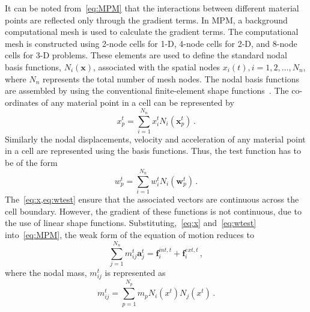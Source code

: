 It can be noted from~\cref{eq:MPM} that the interactions between different 
material points are reflected only through the gradient terms. In MPM, a 
background computational mesh is used to calculate the gradient terms. The 
computational mesh is constructed using 2-node cells for 1-D, 4-node cells for 
2-D, and 8-node cells for 3-D problems. These elements are used to define the 
standard nodal basis functions, $\mathit{N}_{i}(\mathbf{x})$, associated with 
the spatial nodes $\mathbf{\mathit{x}}_{i}(t), 
\mathit{i}=1,2,\dots,\mathit{N}_{n}$, where $\mathit{N}_{n}$ represents the 
total number of mesh nodes. The nodal basis functions are assembled by using 
the conventional finite-element shape functions~\citep{Chen2002}. The 
co-ordinates of any material point in a cell can be represented by
%
\begin{equation}
\mathbf{\mathit{x}}_{p}^{t} = \sum\limits_{\mathit{i}=1}^{\mathit{N}_{n}} 
\mathbf{\mathit{x}}_{\mathit{i}}^{t}\mathit{N}_{\mathit{i}}(\mathbf{x}_{p}^{t}) 
\,.
\label{eq:x}
\end{equation}
%
Similarly the nodal displacements, velocity and acceleration of any material 
point in a cell are represented using the basis functions. Thus, the test 
function has to be of the form
%
\begin{equation}
\mathbf{\mathit{w}}_{p}^{t} = \sum\limits_{\mathit{i}=1}^{\mathit{N}_{n}} 
\mathbf{\mathit{w}}_{\mathit{i}}^{t}\mathit{N}_{\mathit{i}}(\mathbf{w}_{p}^{t}) 
\,.
\label{eq:wtest}
\end{equation}
%
The~\cref{eq:x,eq:wtest} ensure that the associated vectors are 
continuous across the cell boundary. However, the gradient of these functions 
is not continuous, due to the use of linear shape functions. 
Substituting,~\cref{eq:x} and~\cref{eq:wtest} into~\cref{eq:MPM}, the weak form 
of the equation of motion reduces to
%
\begin{equation}
\sum\limits_{\mathit{j}=1}^{\mathit{N}_{n}} m_{\mathit{ij}}^{\mathit{t}} 
\mathbf{a}_{\mathit{j}}^{\mathit{t}} = \mathbf{f}_{\mathit{i}}^{int,\mathit{t}} 
+ \mathbf{f}_{\mathit{i}}^{ext,\mathit{t}} \,,
\label{eq:fmaMPM}
\end{equation}
%
where the nodal mass, $m_{\mathit{ij}}^{\mathit{t}}$ is represented as
%
\begin{equation}
m_{\mathit{ij}}^{\mathit{t}} = \sum\limits_{\mathit{p=1}}^{N_{p}} 
\mathit{m}_{p} \mathit{N}_{\mathit{i}} (\mathbf{\mathit{x}}^{\mathit{t}}) 
\mathit{N}_{\mathit{j}} (\mathbf{\mathit{x}}^{\mathit{t}}) \,.
\end{equation}
